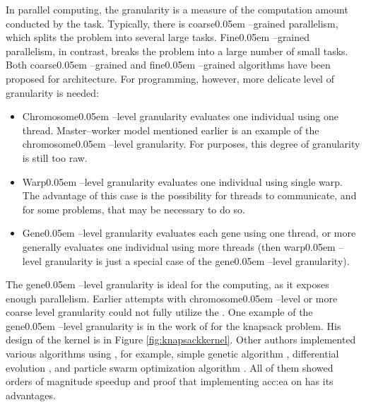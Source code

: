 In parallel computing, the granularity is a measure of the computation amount conducted by the task. Typically, there is coarse\kern0.05em --grained parallelism, which splits the problem into several large tasks. Fine\kern0.05em --grained parallelism, in contrast, breaks the problem into a large number of small tasks. Both coarse\kern0.05em --grained and fine\kern0.05em --grained algorithms have been proposed for \cpu architecture. For \gpu programming, however, more delicate level of granularity is needed:
\begin{itemize}
    \item Chromosome\kern0.05em --level granularity evaluates one individual using one thread. Master--worker model mentioned earlier is an example of the chromosome\kern0.05em --level granularity. For \cuda purposes, this degree of granularity is still too raw.
    \item Warp\kern0.05em --level granularity evaluates one individual using single warp. The advantage of this case is the possibility for threads to communicate, and for some problems, that may be necessary to do so.
    \item Gene\kern0.05em --level granularity evaluates each gene using one thread, or more generally evaluates one individual using more threads (then warp\kern0.05em --level granularity is just a special case of the gene\kern0.05em --level granularity).     
\end{itemize}
The gene\kern0.05em --level granularity is ideal for the \gpu computing, as it exposes enough parallelism. Earlier attempts with chromosome\kern0.05em --level or more coarse level granularity could not fully utilize the \gpuns. One example of the gene\kern0.05em --level granularity is in the work of \citet*{GpuIsland} for the knapsack problem. His design of the \cuda kernel is in Figure \ref{fig:knapsackkernel}. Other authors implemented various algorithms using \cudans, for example, simple genetic algorithm \citep{SimpleGACUDA}, differential evolution \citep{veronese2010differential}, and particle swarm optimization algorithm \citep{PSOCUDA}. All of them showed orders of magnitude speedup and proof that implementing \acrlong{acc:ea} on \gpu has its advantages.

